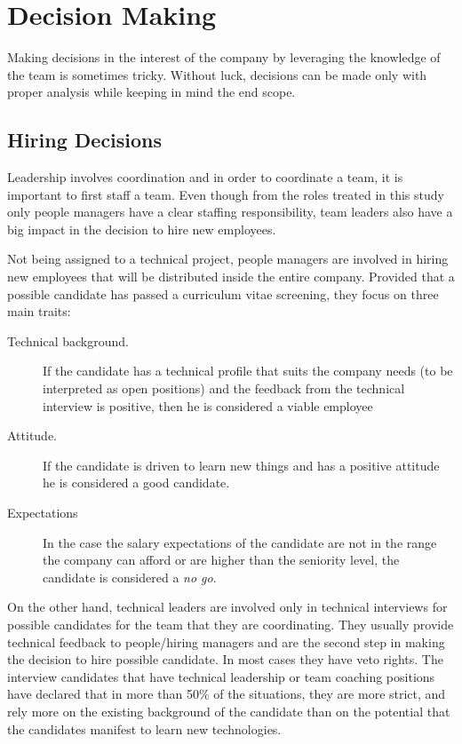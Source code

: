 \chapter{Decision Making}
\label{chapter:decision}
Making decisions in the interest of the company by leveraging the knowledge of the team is sometimes tricky. Without luck, decisions can be made only with proper analysis while keeping in mind the end scope.
\section{Hiring Decisions}
\label{sec:hiring}
Leadership involves coordination and in order to coordinate a team, it is important to first staff a team. Even though from the roles treated in this study only people managers have a clear staffing responsibility, team leaders also have a big impact in the decision to hire new employees. 

Not being assigned to a technical project, people managers are involved in hiring new employees that will be distributed inside the entire company. Provided that a possible candidate has passed a curriculum vitae screening, they focus on three main traits:

\begin{description}
\item [Technical background.] If the candidate has a technical profile that suits the company needs (to be interpreted as open positions) and the feedback from the technical interview is positive, then he is considered a viable employee
\item [Attitude.] If the candidate is driven to learn new things and has a positive attitude he is considered a good candidate.
\item [Expectations] In the case the salary expectations of the candidate are not in the range the company can afford or are higher than the seniority level, the candidate is considered a \textit{no go}.
\end{description}

On the other hand, technical leaders are involved only in technical interviews for possible candidates for the team that they are coordinating. They usually provide technical feedback to people/hiring managers and are the second step in making the decision to hire possible candidate. In most cases they have veto rights. The interview candidates that have technical leadership or team coaching positions have declared that in more than 50\% of the situations, they are more strict, and rely more on the existing background of the candidate than on the potential that the candidates manifest to learn new technologies.

